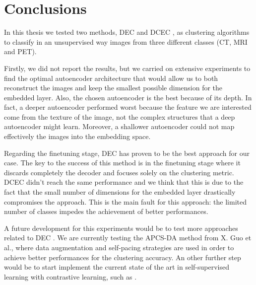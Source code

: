 \chapter{Conclusions}

In this thesis we tested two methods, DEC \cite{xie2016unsupervised} and DCEC \cite{10.1007/978-3-319-70096-0_39}, as clustering algorithms to classify in an unsupervised way images from three different classes (CT, MRI and PET). 

Firstly, we did not report the results, but we carried on extensive experiments to find the optimal autoencoder architecture that would allow us to both reconstruct the images and keep the smallest possible dimension for the embedded layer. Also, the chosen autoencoder is the best because of its depth. In fact, a deeper autoencoder performed worst because the feature we are interested come from the texture of the image, not the complex structures that a deep autoencoder might learn. Moreover, a shallower autoencoder could not map effectively the images into the embedding space. 

Regarding the finetuning stage, DEC has proven to be the best approach for our case. The key to the success of this method is in the finetuning stage where it discards completely the decoder and focuses solely on the clustering metric. DCEC didn't reach the same performance and we think that this is due to the fact that the small number of dimensions for the embedded layer drastically compromises the approach. This is the main fault for this approach: the limited number of classes impedes the achievement of better performances.

A future development for this experiments would be to test more approaches related to DEC \cite{xie2016unsupervised}. We are currently testing the APCS-DA method \cite{Guo2020AdaptiveSD} from X. Guo et al., where data augmentation and self-pacing strategies are used in order to achieve better performances for the clustering accuracy. An other further step would be to start implement the current state of the art in self-supervised learning with contrastive learning, such as \cite{grill2020bootstrap}. 
